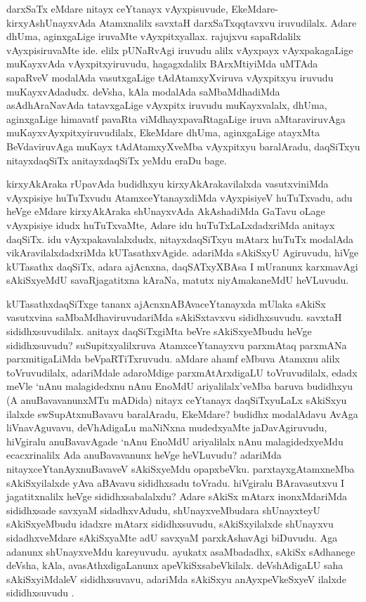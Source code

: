 \begin{artha}
darxSaTx eMdare nitayx ceYtanayx vAyxpisuvude, EkeMdare-kirxyAshUnayxvAda Atamxnalilx savxtaH darxSaTxqqtavxvu iruvudilalx. Adare dhUma, aginxgaLige iruvaMte vAyxpitxyallax. rajujxvu sapaRdalilx vAyxpisiruvaMte ide. elilx pUNaRvAgi iruvudu alilx vAyxpayx vAyxpakagaLige muKayxvAda vAyxpitxyiruvudu, hagagxdalilx BArxMtiyiMda uMTAda sapaRveV modalAda vasutxgaLige tAdAtamxyXviruva vAyxpitxyu iruvudu muKayxvAdadudx. deVsha, kAla modalAda saMbaMdhadiMda asAdhAraNavAda tatavxgaLige vAyxpitx iruvudu muKayxvalalx, dhUma, aginxgaLige himavatf pavaRta viMdhayxpavaRtagaLige iruva aMtaraviruvAga muKayxvAyxpitxyiruvudilalx, EkeMdare dhUma, aginxgaLige atayxMta BeVdaviruvAga muKayx tAdAtamxyXveMba vAyxpitxyu baralAradu, daqSiTxyu nitayxdaqSiTx anitayxdaqSiTx yeMdu eraDu bage.
\end{artha}

\begin{artha}
kirxyAkAraka rUpavAda budidhxyu kirxyAkArakavilalxda vasutxviniMda vAyxpisiye huTuTxvudu AtamxceYtanayxdiMda vAyxpisiyeV huTuTxvadu, adu heVge eMdare kirxyAkAraka shUnayxvAda AkAshadiMda GaTavu oLage vAyxpisiye idudx huTuTxvaMte, Adare idu huTuTxLaLxdadxriMda anitayx daqSiTx. idu vAyxpakavalalxdudx, nitayxdaqSiTxyu mAtarx huTuTx modalAda vikAravilalxdadxriMda kUTasathxvAgide. adariMda sAkiSxyU Agiruvudu, hiVge kUTasathx daqSiTx, adara ajAcnxna, daqSATxyXBAsa I mUranunx karxmavAgi sAkiSxyeMdU savaRjagatitxna kAraNa, matutx niyAmakaneMdU heVLuvudu.
\end{artha}

\begin{artha}
kUTasathxdaqSiTxge tananx ajAcnxnABAvaceYtanayxda mUlaka sAkiSx vasutxvina saMbaMdhaviruvudariMda sAkiSxtavxvu sididhxsuvudu. savxtaH sididhxsuvudilalx. anitayx daqSiTxgiMta beVre sAkiSxyeMbudu heVge sididhxsuvudu? suSupitxyalilxruva AtamxceYtanayxvu parxmAtaq parxmANa parxmitigaLiMda beVpaRTiTxruvudu. aMdare ahamf eMbuva Atamxnu alilx toVruvudilalx, adariMdale adaroMdige parxmAtArxdigaLU toVruvudilalx, edadx meVle `nAnu malagidedxnu nAnu EnoMdU ariyalilalx'veMba baruva budidhxyu (A anuBavavanunxMTu mADida) nitayx ceYtanayx daqSiTxyuLaLx sAkiSxyu ilalxde swSupAtxnuBavavu baralAradu, EkeMdare? budidhx modalAdavu AvAga liVnavAguvavu, deVhAdigaLu maNiNxna mudedxyaMte jaDavAgiruvudu, hiVgiralu anuBavavAgade `nAnu EnoMdU ariyalilalx nAnu malagidedxyeMdu ecacxrinalilx Ada anuBavavanunx heVge heVLuvudu? adariMda nitayxceYtanAyxnuBavaveV sAkiSxyeMdu opapxbeVku. parxtayxgAtamxneMba sAkiSxyilalxde yAva aBAvavu sididhxsadu toVradu. hiVgiralu BAravasutxvu I jagatitxnalilx heVge sididhxsabalalxdu? Adare sAkiSx mAtarx inonxMdariMda sididhxsade savxyaM sidadhxvAdudu, shUnayxveMbudara shUnayxteyU sAkiSxyeMbudu idadxre mAtarx sididhxsuvudu, sAkiSxyilalxde shUnayxvu sidadhxveMdare sAkiSxyaMte adU savxyaM parxkAshavAgi biDuvudu. Aga adanunx shUnayxveMdu kareyuvudu. ayukatx asaMbadadhx, sAkiSx sAdhanege deVsha, kAla, avasAthxdigaLanunx apeVkiSxsabeVkilalx. deVshAdigaLU saha sAkiSxyiMdaleV sididhxsuvavu, adariMda sAkiSxyu anAyxpeVkeSxyeV ilalxde sididhxsuvudu .
\end{artha}

